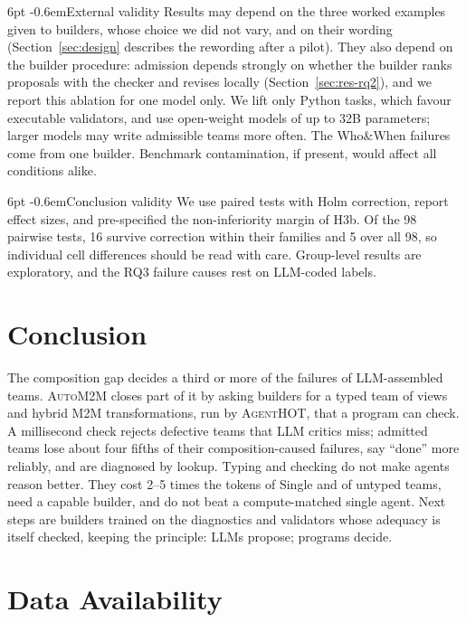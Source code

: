 \documentclass[pdflatex,sn-mathphys-num]{sn-jnl}
\makeatletter
\theoremstyle{thmstyleone}%
\theoremstyle{thmstyletwo}%
\theoremstyle{thmstylethree}%
\newcommand{\tool}{\textsc{AgentHOT}}
\newcommand{\auto}{\textsc{AutoM2M}}
\renewcommand\paragraph{\@startsection{paragraph}{4}{\z@}%
  {6pt \@plus 2pt \@minus 1pt}{-0.6em}{\normalfont\normalsize\bfseries}}
\makeatother
\begin{document}
\paragraph{External validity} Results may depend on the three worked examples
given to builders, whose choice we did not vary, and on their wording
(Section~\ref{sec:design} describes the rewording after a pilot). They also
depend on the builder procedure: admission depends strongly on whether the
builder ranks proposals with the checker and revises locally
(Section~\ref{sec:res-rq2}), and we report this ablation for one model only. We
lift only Python tasks, which favour executable validators, and use open-weight
models of up to 32B parameters; larger models may write admissible teams more
often. The Who\&When failures come from one builder. Benchmark contamination,
if present, would affect all conditions alike.

\paragraph{Conclusion validity} We use paired tests with Holm correction,
report effect sizes, and pre-specified the non-inferiority margin of H3b. Of the
98 pairwise tests, 16 survive correction within their families and 5 over all
98, so individual cell differences should be read with care. Group-level
results are exploratory, and the RQ3 failure causes rest on LLM-coded labels.

\section{Conclusion}\label{sec:conclusion}

The composition gap decides a third or more of the failures of LLM-assembled
teams. \auto{} closes part of it by asking builders for a typed team of views
and hybrid M2M transformations, run by \tool{}, that a program can check. A
millisecond check rejects defective teams that LLM critics miss; admitted teams
lose about four fifths of their composition-caused failures, say ``done'' more
reliably, and are diagnosed by lookup. Typing and checking do not make agents
reason better. They cost 2--5 times the tokens of Single and of untyped teams,
need a capable builder, and do not beat a compute-matched single agent. Next
steps are builders trained on the diagnostics and validators whose adequacy is
itself checked, keeping the principle: LLMs propose; programs decide.

\section*{Data Availability}\label{sec:data}
\end{document}
